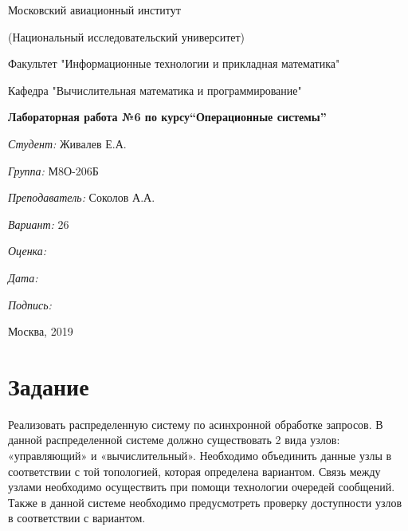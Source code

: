 \documentclass[a4paper, 12pt]{article}
\begin{document}
\thispagestyle{empty}	
\begin{center}
	Московский авиационный институт
	
	(Национальный исследовательский университет)
	
	Факультет "Информационные технологии и прикладная математика"
	
	Кафедра "Вычислительная математика и программирование"
	
\end{center}
\vspace{40ex}
\begin{center}
	\textbf{\large{Лабораторная работа №6 по курсу\linebreak \textquotedblleft Операционные системы\textquotedblright}}
\end{center}
\vspace{35ex}
\begin{flushright}
	\textit{Студент: } Живалев Е.А.
	
	\vspace{2ex}
	\textit{Группа: } М8О-206Б
	
	\vspace{2ex}
	\textit{Преподаватель: } Соколов А.А.
	
	\vspace{2ex}
	\textit{Вариант: } 26
	
	\vspace{2ex}
	\textit{Оценка: } \underline{\quad\quad\quad\quad\quad\quad}
	
	 \vspace{2ex}
	\textit{Дата: } \underline{\quad\quad\quad\quad\quad\quad}
	
	\vspace{2ex}
	\textit{Подпись: } \underline{\quad\quad\quad\quad\quad\quad}
	
\end{flushright}

\vspace{5ex}

\begin{vfill}
	\begin{center}
		Москва, 2019
	\end{center}	
\end{vfill}
\newpage

\section{Задание}

Реализовать распределенную систему по асинхронной обработке запросов. В данной
распределенной системе должно существовать 2 вида узлов: «управляющий» и
«вычислительный». Необходимо объединить данные узлы в соответствии с той топологией,
которая определена вариантом. Связь между узлами необходимо осуществить при помощи
технологии очередей сообщений. Также в данной системе необходимо предусмотреть проверку
доступности узлов в соответствии с вариантом.
\end{document}
